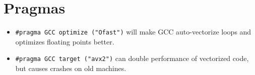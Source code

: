 \section*{Pragmas}
	\begin{itemize}
		\item \lstinline{#pragma GCC optimize ("Ofast")} will make GCC auto-vectorize loops and optimizes floating points better.
		\item \lstinline{#pragma GCC target ("avx2")} can double performance of vectorized code, but causes crashes on old machines.
	\end{itemize}

